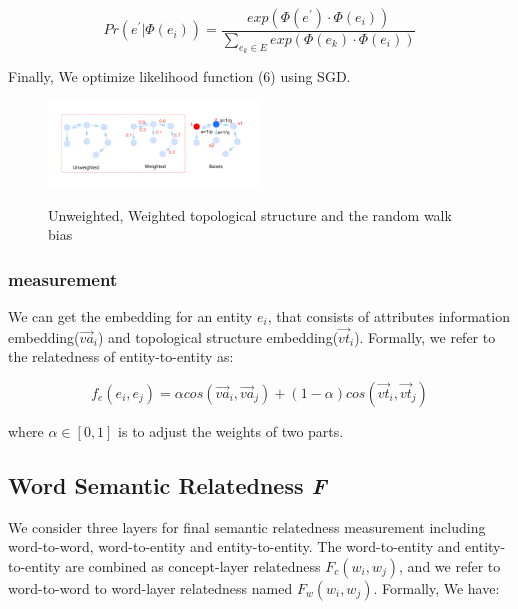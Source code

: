 \begin{small}
    \begin{equation}
        Pr(e^{'}|\Phi(e_i)) = \frac{exp(\Phi(e^{'})\cdot \Phi(e_i))}{\sum_{e_k \in E}^{ }exp(\Phi(e_k)\cdot \Phi(e_i))}
    \end{equation}
\end{small}Finally, We optimize  likelihood function (6) using SGD.

\begin{figure}
    \flushleft
    \includegraphics[width=0.5\textwidth]{pic/graph.pdf}\\
    \caption{Unweighted, Weighted topological structure and the random walk bias}
    \label{two_graph}
\end{figure}

\subsubsection{measurement}
We can get the embedding for an entity $e_i$, that consists of attributes information embedding($\overrightarrow {va}_i$) and
topological structure embedding($\overrightarrow {vt}_i$). Formally, we refer to the relatedness of entity-to-entity as:

\begin{small}
    \begin{equation}
        f_e(e_i, e_j) = \alpha cos({\overrightarrow {va}_i, \overrightarrow {va}_j}) 
        + (1-\alpha)cos(\overrightarrow {vt}_i,\overrightarrow {vt}_j)
    \end{equation}
\end{small}where $\alpha \in [0,1]$ is to adjust the weights of two parts.


\subsection{Word Semantic Relatedness \emph{F}}
We consider three layers for final semantic relatedness measurement including word-to-word, word-to-entity and entity-to-entity.
The word-to-entity and entity-to-entity are combined as concept-layer relatedness $F_c(w_i, w_j)$, and we refer to
word-to-word to word-layer relatedness named $F_w(w_i, w_j)$. Formally, We have:

